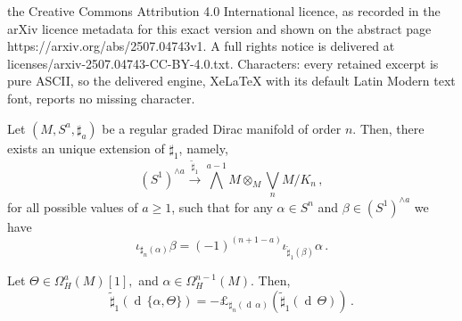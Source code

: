 \documentclass[10pt,a4paper]{amsart}
\newcommand{\dd}{\operatorname{d}\,}
\begin{document}
the Creative Commons Attribution 4.0 International licence, as recorded in the arXiv licence metadata for this exact version and shown on the abstract page https://arxiv.org/abs/2507.04743v1. A full rights notice is delivered at licenses/arxiv-2507.04743-CC-BY-4.0.txt. Characters: every retained excerpt is pure ASCII, so the delivered engine, XeLaTeX with its default Latin Modern text font, reports no missing character.
\begin{theorem}
\label{thm:extension_of_sharp_1}
Let $(M, S^a, \sharp_a)$ be a regular graded Dirac manifold of order $n$. Then, there exists an unique extension of $\sharp_1$, namely,
\[
(S^1)^{\wedge a} \xrightarrow{\widetilde \sharp_1} \bigwedge^{a - 1}M \otimes_M \bigvee_n M/K_n\,,
\]
for all possible values of $a \geq 1$, such that for any $\alpha \in S^n$ and $\beta \in (S^1)^{\wedge a}$ we have
\[
\iota_{\sharp_n(\alpha)} \beta  = (-1)^{(n + 1 - a)} \iota_{\widetilde \sharp_1(\beta)} \alpha\,.
\]

\end{theorem}

\begin{proposition}
\label{prop:sharp_of_bracket}
Let $\Theta \in \Omega^{a}_H(M)[1],$ and $\alpha \in \Omega^{n-1}_H(M).$ Then,
\[
\widetilde \sharp_1(\dd \{\alpha, \Theta\}) = -\pounds_{\sharp_n (\dd \alpha)} \left(\widetilde{\sharp}_1(\dd \Theta)  \right)\,. 
\]
\end{proposition}
\end{document}
